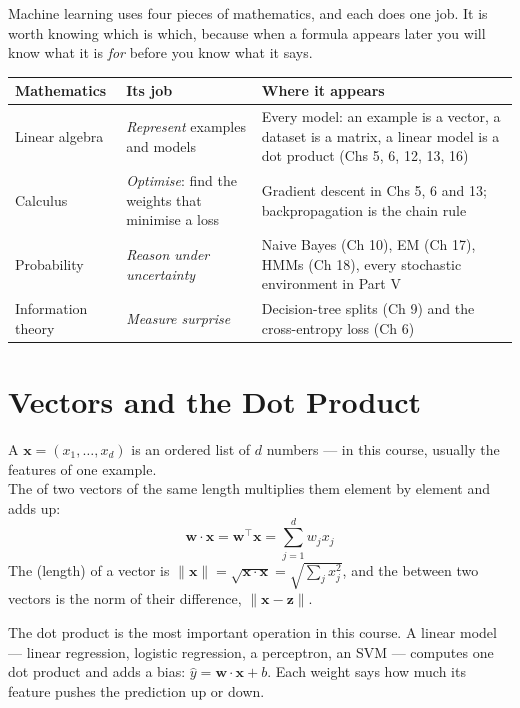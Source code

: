Machine learning uses four pieces of mathematics, and each does one job. It is
worth knowing which is which, because when a formula appears later you will know
what it is \emph{for} before you know what it says.

\begin{longtable}{@{}L{3.0cm}L{5.4cm}L{6.6cm}@{}}
\toprule
{}
\textbf{Mathematics} & \textbf{Its job} & \textbf{Where it appears} \\
\midrule
\endhead
Linear algebra & \emph{Represent} examples and models & Every model: an example is
a vector, a dataset is a matrix, a linear model is a dot product (Chs 5, 6, 12, 13,
16) \\
Calculus & \emph{Optimise}: find the weights that minimise a loss & Gradient
descent in Chs 5, 6 and 13; backpropagation is the chain rule \\
Probability & \emph{Reason under uncertainty} & Naive Bayes (Ch 10), EM (Ch 17),
HMMs (Ch 18), every stochastic environment in Part V \\
Information theory & \emph{Measure surprise} & Decision-tree splits (Ch 9) and the
cross-entropy loss (Ch 6) \\
\bottomrule
\end{longtable}

\section{Vectors and the Dot Product}

\begin{definitionbox}
A  $\mathbf{x} = (x_1, \dots, x_d)$ is an ordered list of $d$
numbers --- in this course, usually the features of one example.\\[3pt]
The  of two vectors of the same length multiplies them
element by element and adds up:
\[
\mathbf{w} \cdot \mathbf{x} = \mathbf{w}^{\top}\mathbf{x} = \sum_{j=1}^{d} w_j x_j
\]
The  (length) of a vector is $\|\mathbf{x}\| = \sqrt{\mathbf{x}\cdot\mathbf{x}}
= \sqrt{\sum_j x_j^2}$, and the  between two vectors is
the norm of their difference, $\|\mathbf{x} - \mathbf{z}\|$.
\end{definitionbox}

The dot product is the most important operation in this course. A linear model
--- linear regression, logistic regression, a perceptron, an SVM --- computes one
dot product and adds a bias: $\hat{y} = \mathbf{w}\cdot\mathbf{x} + b$. Each
weight says how much its feature pushes the prediction up or down.

